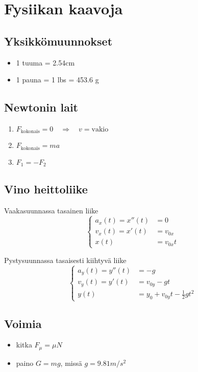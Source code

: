 \documentclass[12pt]{article}
\begin{document}
\newpage

\section*{Fysiikan kaavoja}

\subsection*{Yksikkömuunnokset}
\begin{itemize}
\item 1 tuuma = 2.54cm
\item 1 pauna = 1 lbs = 453.6 g
\end{itemize}

\subsection*{Newtonin lait}
\begin{enumerate}
\item $F_{\textrm{kokonais}}=0 \quad\Rightarrow\quad v=\textrm{vakio}$
\item $F_{\textrm{kokonais}}=ma$
\item $F_1=-F_2$
\end{enumerate}

\subsection*{Vino heittoliike}

Vaakasuunnassa tasainen liike
$$
\begin{cases}
a_x(t)=x''(t)&=0\\
v_x(t)=x'(t)&=v_{0x}\\
x(t)&=v_{0x}t
\end{cases}
$$

Pystysuunnassa tasaisesti kiihtyvä liike
$$
\begin{cases}
a_y(t)=y''(t)&=-g\\
v_y(t)=y'(t)&=v_{0y}-gt\\
y(t)&=y_0+v_{0y}t-\frac12 gt^2
\end{cases}
$$

\subsection*{Voimia}

\begin{itemize}
\item kitka $F_\mu=\mu N$
\item paino $G=mg$, missä $g=9.81 m/s^2$
\end{itemize}
\end{document}
